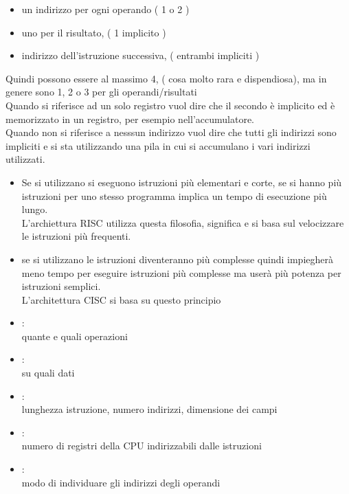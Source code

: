 \documentclass[arch.tex]{subfiles}
\begin{document}
%
\label{ppar:Indirizzi necessari per un'istruzione}



\begin{itemize}
	\item un indirizzo per ogni operando ( 1 o 2 ) 
	\item uno per il risultato, ( 1 implicito ) 
	\item indirizzo dell'istruzione successiva, ( entrambi impliciti ) 
\end{itemize}
Quindi possono essere al massimo 4, ( cosa molto rara e dispendiosa), ma in genere
sono 1, 2 o 3 per gli operandi/risultati\\
Quando si riferisce ad un solo registro vuol dire che il secondo è implicito ed è 
memorizzato in un registro, per esempio nell'accumulatore.\\
Quando non si riferisce a nesssun indirizzo vuol dire che tutti gli indirizzi sono
impliciti e si sta utilizzando una pila in cui si accumulano i vari indirizzi
utilizzati.

\begin{itemize}
	\item Se si utilizzano  si eseguono istruzioni più elementari
		e corte, se si hanno più istruzioni per uno stesso programma implica un tempo 
		di esecuzione più lungo.\\
		L'archiettura RISC utilizza questa filosofia, 
		significa 
		e si basa sul velocizzare le istruzioni più frequenti.
	\item se si utilizzano  le istruzioni diventeranno 
		più complesse quindi impiegherà meno tempo per eseguire istruzioni
		più complesse ma userà più potenza per istruzioni semplici.\\
		L'architettura CISC si basa su questo principio 
\end{itemize}

%
\label{ppar:Progettazione di un'istruction set}


\begin{itemize}
	\item {}:\\
		quante e quali operazioni
	\item {}:\\
		su quali dati
	\item {}:\\
		lunghezza istruzione, numero indirizzi, dimensione dei campi
	\item {}:\\
		numero di registri della CPU indirizzabili dalle istruzioni
	\item {}:\\
		modo di individuare gli indirizzi degli operandi
\end{itemize}
\end{document}

